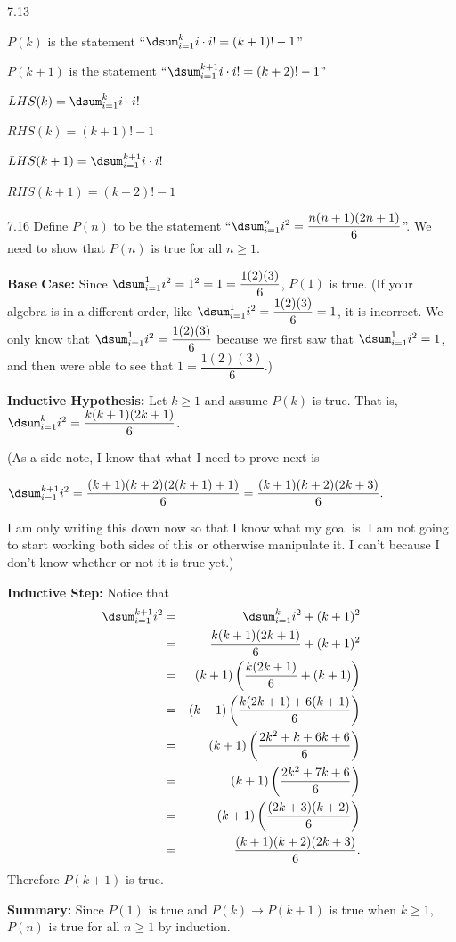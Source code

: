 \begin{Answer}{7.13}
\begin{lenum}
\item $P(k)$ is the statement ``$\dsum_{i=1}^{k} i\cdot i! = (k+1)!-1$''
\item $P(k+1)$ is the statement ``$\dsum_{i=1}^{k+1} i\cdot i! = (k+2)!-1$''
\item $LHS(k)=\dsum_{i=1}^{k} i\cdot i!$
\item $RHS(k)=(k+1)!-1$
\item $LHS(k+1)=\dsum_{i=1}^{k+1} i\cdot i!$
\item $RHS(k+1)=(k+2)!-1$
\end{lenum}
\end{Answer}
\begin{Answer}{7.16}
Define $P(n)$ to be the statement ``$\dsum _{i=1}^n i^2 = \dfrac{n(n+1)(2n+1)}{6}$''.
We need to show that $P(n)$ is true for all $n\geq 1$.

\noindent
{\bf Base Case:}
Since $\dsum _{i=1}^1 i^2 = 1^2 = 1 =  \dfrac{1(2)(3)}{6}$,
$P(1)$ is true. (If your algebra is in a different order, like
$\dsum _{i=1}^1 i^2 = \dfrac{1(2)(3)}{6}= 1$, it is incorrect.  We only know that
$\dsum _{i=1}^1 i^2 = \dfrac{1(2)(3)}{6}$ because we first saw that $\dsum _{i=1}^1 i^2=1$,
and then were able to see that $1 =  \dfrac{1(2)(3)}{6}$.)

\noindent
{\bf Inductive Hypothesis:}
Let $k\geq 1$ and assume $P(k)$ is true.  That is, $\dsum _{i=1}^k i^2 = \dfrac{k(k+1)(2k+1)}{6}$.

\noindent
(As a side note, I know that what I need to prove next is

\noindent
$\displaystyle\dsum _{i=1}^{k+1} i^2 = \dfrac{(k+1)(k+2)(2(k+1)+1)}{6}=\dfrac{(k+1)(k+2)(2k+3)}{6}.$

\noindent
I am only writing this down now so that I know what my goal is.  I am not going to start working
both sides of this or otherwise manipulate it.  I can't because I don't know whether or not it is
true yet.)

\noindent
{\bf Inductive Step:}
Notice that
\begin{eqnarray*}
\dsum _{i=1}^{k+1} i^2&=&\dsum _{i=1}^k i^2+(k+1)^2\\
&=&\dfrac{k(k+1)(2k+1)}{6}+(k+1)^2\\
&=&(k+1)\left(\dfrac{k(2k+1)}{6}+(k+1)\right)\\
&=&(k+1)\left(\dfrac{k(2k+1)+6(k+1)}{6}\right)\\
&=&(k+1)\left(\dfrac{2k^2 + k + 6k+ 6}{6}\right)\\
&=&(k+1)\left(\dfrac{2k^2 + 7k+ 6}{6}\right)\\
&=&(k+1)\left(\dfrac{(2k+3)(k+2)}{6}\right)\\
&=&\dfrac{(k+1)(k+2)(2k+3)}{6}.
\end{eqnarray*}
Therefore $P(k+1)$ is true.

\noindent
{\bf Summary:} Since $P(1)$ is true and $P(k)\rightarrow P(k+1)$ is true when $k\geq 1$,
$P(n)$ is true for all $n\geq 1$ by induction.
\end{Answer}
